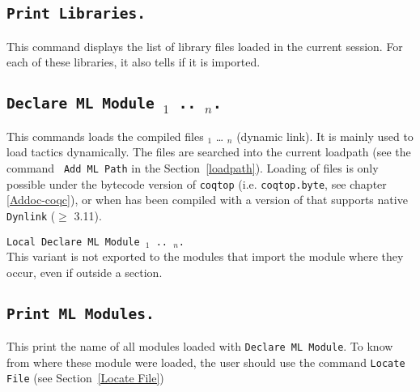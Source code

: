 \subsection[\tt Print Libraries.]{\tt Print Libraries.}

This command displays the list of library files loaded in the current
{\Coq} session. For each of these libraries, it also tells if it is
imported.

\subsection[\tt Declare ML Module {\str$_1$} .. {\str$_n$}.]{\tt Declare ML Module {\str$_1$} .. {\str$_n$}.}
This commands loads the {\ocaml} compiled files {\str$_1$} {\ldots}
{\str$_n$} (dynamic link). It is mainly used to load tactics
dynamically.
 The files are
searched into the current {\ocaml} loadpath (see the command {\tt
Add ML Path} in the Section~\ref{loadpath}).  Loading of {\ocaml}
files is only possible under the bytecode version of {\tt coqtop}
(i.e. {\tt coqtop.byte}, see chapter
\ref{Addoc-coqc}), or when {\Coq} has been compiled with a version of
{\ocaml} that supports native {\tt Dynlink} ($\ge$ 3.11).

\begin{Variants}
\item {\tt Local Declare ML Module {\str$_1$} .. {\str$_n$}.}\\
  This variant is not exported to the modules that import the module
  where they occur, even if outside a section.
\end{Variants}

\begin{ErrMsgs}
\item {}
\item {}
\end{ErrMsgs}

\subsection[\tt Print ML Modules.]{\tt Print ML Modules.}
This print the name of all \ocaml{} modules loaded with \texttt{Declare
  ML Module}. To know from where these module were loaded, the user
should use the command \texttt{Locate File} (see Section~\ref{Locate File})

